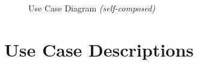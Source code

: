 \begin{figure}[h!]
\centering
{}
\caption{Use Case Diagram \textit{(self-composed)}}
\label{fig:use-case-diagram}
\end{figure}


\section{Use Case Descriptions}

